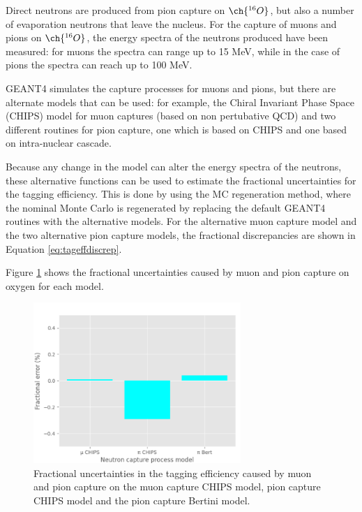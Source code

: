Direct neutrons are produced from pion capture on $\ch{^{16}O}$, but also a number of evaporation neutrons that leave the nucleus. For the capture of muons and pions on $\ch{^{16}O}$, the energy spectra of the neutrons produced have been measured: for muons the spectra can range up to 15 MeV, while in the case of pions the spectra can reach up to 100 MeV.


GEANT4 simulates the capture processes for muons and pions, but there are alternate models that can be used: for example, the Chiral Invariant Phase Space (CHIPS) model for muon captures (based on non pertubative QCD) and two different routines for pion capture, one which is based on CHIPS and one based on intra-nuclear cascade.

Because any change in the model can alter the energy spectra of the neutrons, these alternative functions can be used to estimate the fractional uncertainties for the tagging efficiency. This is done by using the MC regeneration method, where the nominal Monte Carlo is regenerated by replacing the default GEANT4 routines with the alternative models. For the alternative muon capture model and the two alternative pion capture models, the fractional discrepancies are shown in Equation \ref{eq:tageffdiscrep}.

Figure \ref{fig:mupicap_uncertainty} shows the fractional uncertainties caused by muon and pion capture on oxygen for each model.

\begin{figure}[!htb]
\centering
    \includegraphics[width=0.7\textwidth]{Figures/mupicap_uncertainty.png}
\caption{Fractional uncertainties in the tagging efficiency caused by muon and pion capture on the muon capture CHIPS model, pion capture CHIPS model and the pion capture Bertini model.}
\label{fig:mupicap_uncertainty}
\end{figure}

